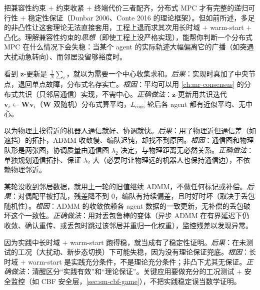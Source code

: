 把兼容性约束 $+$ 约束收紧 $+$ 终端代价三者配齐，分布式 MPC 才有完整的递归可行性 $+$ 稳定性保证（Dunbar 2006\cite{dunbar2006distributed}、Conte 2016\cite{conte2016distributed} 的理论框架）。但如前所述，多足的非凸性让这套理论无法直接套用，工程上退而求其次用长时域 $+$ warm-start $+$ 凸化。理解兼容性约束的\emph{思想}（即使工程上没严格实现），能帮你判断一个分布式 MPC 在什么情况下会失稳：当某个 agent 的实际轨迹大幅偏离它的广播（如突遇大扰动急转向）、而邻居没留够裕度时。

\begin{pitfall}
看到 $\mathbf{z}$-更新是 $\tfrac1N\sum_i$，就以为需要一个中心收集求和。\emph{后果}：实现时真加了中央节点，退回单点故障，分布式名存实亡。\emph{根因}：平均可以用 \cref{ch:mr-consensus} 的分布式共识（只邻居通信）实现，不需中心。\emph{正确做法}：$\mathbf{z}$-更新用共识迭代 $\mathbf{v}_i\leftarrow\mathbf{W}\mathbf{v}_i$（$\mathbf{W}$ 双随机）分布式算平均，$L_{\text{cons}}$ 轮后各 agent 都有近似平均、无中心。
\end{pitfall}

\begin{pitfall}
以为物理上挨得近的机器人通信就好、协调就快。\emph{后果}：用了物理近但通信差（如遮挡）的拓扑，ADMM 收敛慢、编队迟钝，却找不到原因。\emph{根因}：通信图和物理队形是两张图，协调质量由通信图 $\lambda_2$ 决定，与物理距离无必然关系。\emph{正确做法}：单独规划通信拓扑、保证 $\lambda_2$ 大（必要时让物理远的机器人也保持通信边），不依赖物理邻近。
\end{pitfall}

\begin{pitfall}
某轮没收到邻居数据，就用上一轮的旧值继续 ADMM，不做任何标记或补偿。\emph{后果}：对偶配平被打乱，残差降不到 $0$，编队有持续偏差，且时好时坏（取决于丢包随机性）。\emph{根因}：ADMM 的收敛依赖各 agent 数据的一致更新，无补偿的丢包破坏这个一致性。\emph{正确做法}：用对丢包鲁棒的变体（异步 ADMM 在有界延迟下仍收敛、确认重传、或丢包时跳过该邻居并重归一化权重），监控残差以发现异常。
\end{pitfall}

\begin{pitfall}
因为实践中长时域 $+$ warm-start 跑得稳，就当成有了稳定性证明。\emph{后果}：在未测试的工况（大扰动、新步态切换）下可能失稳，因为没有理论保证兜底。\emph{根因}：长时域 $+$ warm-start 是实践充分条件，不是理论充分条件；非凸下尤其无保证。\emph{正确做法}：清醒区分“实践有效”和“理论保证”。关键应用要做充分的工况测试 $+$ 安全监控（如 CBF 安全层，\cref{sec:sm-cbf-game}），不把实践稳定误当数学证明。
\end{pitfall}

